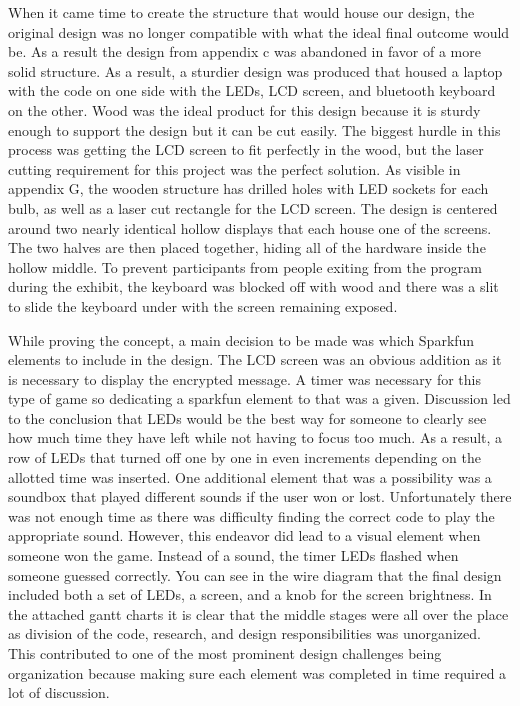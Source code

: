 \documentclass[conference]{IEEEtran}
\begin{document}
\par When it came time to create the structure that would house our design, the original design was no longer compatible with what the ideal final outcome would be. As a result the design from appendix c was abandoned in favor of a more solid structure. As a result, a sturdier design was produced that housed a laptop with the code on one side with the LEDs, LCD screen, and bluetooth keyboard on the other. Wood was the ideal product for this design because it is sturdy enough to support the design but it can be cut easily. The biggest hurdle in this process was getting the LCD screen to fit perfectly in the wood, but the laser cutting requirement for this project was the perfect solution.  As visible in appendix G, the wooden structure has drilled holes with LED sockets for each bulb, as well as a laser cut rectangle for the LCD screen. The design is centered around two nearly identical hollow displays that each house one of the screens. The two halves are then placed together, hiding all of the hardware inside the hollow middle. To prevent participants from people exiting from the program during the exhibit, the keyboard was blocked off with wood and there was a slit to slide the keyboard under with the screen remaining exposed.  
\par While proving the concept, a main decision to be made was which Sparkfun elements to include in the design. The LCD screen was an obvious addition as it is necessary to display the encrypted message. A timer was necessary for this type of game so dedicating a sparkfun element to that was a given. Discussion led to the conclusion that LEDs would be the best way for someone to clearly see how much time they have left while not having to focus too much. As a result, a row of LEDs that turned off one by one in even increments depending on the allotted time was inserted. One additional element that was a possibility was a soundbox that played different sounds if the user won or lost. Unfortunately there was not enough time as there was difficulty finding the correct code to play the appropriate sound. However, this endeavor did lead to a visual element when someone won the game. Instead of a sound, the timer LEDs flashed when someone guessed correctly. You can see in the wire diagram that the final design included both a set of LEDs, a screen, and a knob for the screen brightness. In the attached gantt charts it is clear that the middle stages were all over the place as division of the code, research, and design responsibilities was unorganized. This contributed to one of the most prominent design challenges being organization because making sure each element was completed in time required a lot of discussion. 
\end{document}
